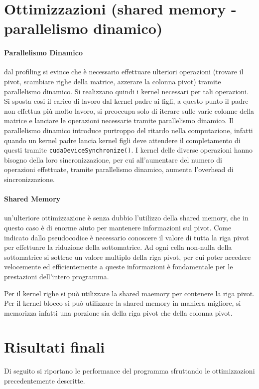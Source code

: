 \documentclass{article}
\begin{document}
\section{Ottimizzazioni (shared memory - parallelismo dinamico)}
\paragraph{Parallelismo Dinamico} dal profiling si evince che è necessario effettuare ulteriori operazioni (trovare il pivot, scambiare righe della matrice, azzerare la colonna pivot) tramite parallelismo dinamico. Si realizzano quindi i kernel necessari per tali operazioni. Si sposta cosi il carico di lavoro dal kernel padre ai figli, a questo punto il padre non effettua più molto lavoro, si preoccupa solo di iterare sulle varie colonne della matrice e lanciare le operazioni necessarie tramite parallelismo dinamico. Il parallelismo dinamico introduce purtroppo del ritardo nella computazione, infatti quando un kernel padre lancia kernel figli deve attendere il completamento di questi tramite \texttt{cudaDeviceSynchronize()}. I kernel delle diverse operazioni hanno bisogno della loro sincronizzazione, per cui all'aumentare del numero di operazioni effettuate, tramite parallelismo dinamico, aumenta l'overhead di sincronizzazione. 

\paragraph{Shared Memory} un'ulteriore ottimizzazione è senza dubbio l'utilizzo della shared memory, che in questo caso è di enorme aiuto per mantenere informazioni sul pivot. Come indicato dallo pseudocodice è necessario conoscere il valore di tutta la riga pivot per effettuare la riduzione della sottomatrice. Ad ogni cella non-nulla della sottomatrice si sottrae un valore multiplo della riga pivot, per cui poter accedere velocemente ed efficientemente a queste informazioni è fondamentale per le prestazioni dell'intero programma.

Per il kernel righe si può utilizzare la shared maemory per contenere la riga pivot. Per il kernel blocco si può utilizzare la shared memory in maniera migliore, si memorizza infatti una porzione sia della riga pivot che della colonna pivot. 

\section{Risultati finali}
Di seguito si riportano le performance del programma sfruttando le ottimizzazioni precedentemente descritte.
\end{document}
